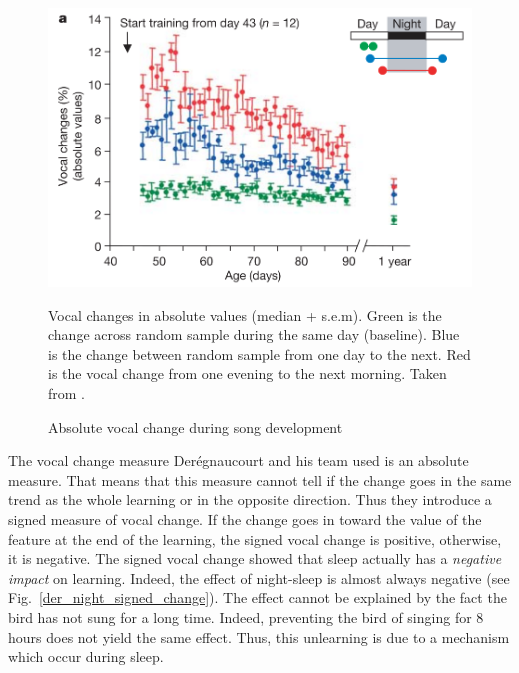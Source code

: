 \documentclass{report}
\begin{document}
\begin{figure}[htpb]
  {\center
  \includegraphics[width=0.7\linewidth]{media/der_absolute_vocal_change}
  \caption{Absolute vocal change during song development\label{der_abs_vocal_change}}}
  \small
  Vocal changes in absolute values (median + s.e.m). Green is the change across random sample during the same day (baseline). Blue is the change between random sample from one day to the next. Red is the vocal change from one evening to the next morning. Taken from \textcite{deregnaucourt_how_2005}.
\end{figure}

The vocal change measure Derégnaucourt and his team used is an absolute measure.
That means that this measure cannot tell if the change goes in the same trend as
the whole learning or in the opposite direction. Thus they introduce a signed
measure of vocal change. If the change goes in toward the value of the feature
at the end of the learning, the signed vocal change is positive, otherwise, it
is negative. The signed vocal change showed that sleep actually has a
\emph{negative impact} on learning. Indeed, the effect of night-sleep is almost
always negative (see Fig.~\ref{der_night_signed_change}). The effect cannot be
explained by the fact the bird has not sung for a long time. Indeed, preventing
the bird of singing for 8 hours does not yield the same effect. Thus, this
unlearning is due to a mechanism which occur during sleep.
\end{document}

